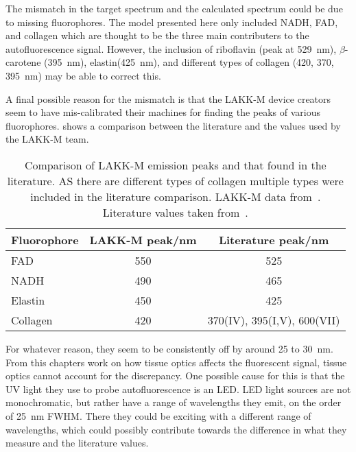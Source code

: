 The mismatch in the target spectrum and the calculated spectrum could be due to missing fluorophores. 
The model presented here only included NADH, FAD, and collagen which are thought to be the three main contributers to the autofluorescence signal.
However, the inclusion of riboflavin (peak at 529~nm), $\beta$-carotene (395~nm), elastin(425~nm), and different types of collagen (420, 370, 395~nm) may be able to correct this.

A final possible reason for the mismatch is that the LAKK-M device creators seem to have mis-calibrated their machines for finding the peaks of various fluorophores.
 shows a comparison between the literature and the values used by the LAKK-M team.

\begin{table}[!htbp]
  \centering

  \begin{tabular}{l|cc}

  \hline
  Fluorophore & LAKK-M peak/nm & Literature peak/nm \\
  \hline
   FAD  & 550& 525\\
   NADH  & 490& 465\\
   Elastin  & 450& 425\\
   Collagen  & 420 & 370(IV), 395(I,V), 600(VII)\\

  \hline

  \end{tabular}
  \caption{Comparison of LAKK-M emission peaks and that found in the literature. AS there are different types of collagen multiple types were included in the literature comparison. LAKK-M data from~\cite{palmer2016changes,dunaev2015individual,smirnova2012collagen,palmer2016development}. Literature values taken from~\cite{dacosta2003molecular,pan2015detection,islam2013ph,patterson2000separation}.}
  \label{tab:flurocompvalues}

\end{table}

For whatever reason, they seem to be consistently off by around 25 to 30~nm.
From this chapters work on how tissue optics affects the fluorescent signal, tissue optics cannot account for the discrepancy.
One possible cause for this is that the UV light they use to probe autofluorescence is an LED\@.
LED light sources are not monochromatic, but rather have a range of wavelengths they emit, on the order of 25~nm FWHM\@.
There they could be exciting with a different range of wavelengths, which could possibly contribute towards the difference in what they measure and the literature values.

